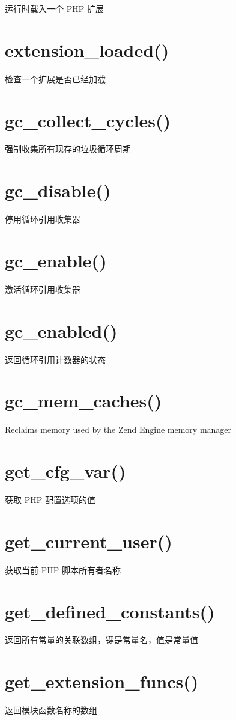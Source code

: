 运行时载入一个 PHP 扩展
\section{extension\_loaded()}

检查一个扩展是否已经加载
\section{gc\_collect\_cycles()}

强制收集所有现存的垃圾循环周期
\section{gc\_disable()}

停用循环引用收集器
\section{gc\_enable()}

激活循环引用收集器
\section{gc\_enabled()}

返回循环引用计数器的状态
\section{gc\_mem\_caches()}

Reclaims memory used by the Zend Engine memory manager
\section{get\_cfg\_var()}

获取 PHP 配置选项的值
\section{get\_current\_user()}

获取当前 PHP 脚本所有者名称
\section{get\_defined\_constants()}

返回所有常量的关联数组，键是常量名，值是常量值
\section{get\_extension\_funcs()}

返回模块函数名称的数组
